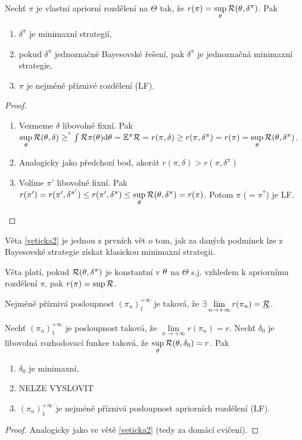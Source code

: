 \begin{theorem}\label{veticka2}
	Nechť $\pi$ je vlastní apriorní rozdělení na $\Theta$ tak, že $r(\pi)=\sup\limits_\theta\mathcal{R}(\theta,\delta^\pi)$. Pak \begin{enumerate}
		\item $\delta^\pi$ je minimaxní strategií,
		\item pokud $\delta^\pi$ jednoznačné Bayesovské řešení, pak $\delta^\pi$ je jednoznačná minimaxní strategie,
		\item $\pi$ je nejméně příznivé rozdělení (LF). 
	\end{enumerate}
\begin{proof}
	\begin{enumerate}
		\item Vezmeme $\delta$ libovolné fixní. Pak $\sup\limits_\t\RF(\t,\delta)\geq^{\text{\footnotemark}}\int\RF\pi(\t)\d\t=\E^\pi\RF=r(\pi,\delta)\geq r(\pi,\delta^\pi)=r(\pi)=\sup\limits_\t\RF(\t,\delta^\pi)$. 
		\item Analogicky jako předchozí bod, akorát $r(\pi,\delta)> r(\pi,\delta^\pi)$
		\item Volíme $\pi'$ libovolné fixní. Pak $r(\pi')=r(\pi',\delta^{\pi'})\leq r(\pi',\delta^\pi)\leq \sup\limits_\theta\mathcal{R}(\theta,\delta^\pi)=r(\pi)$. Potom $\pi$ ($=\pi^\ast$) je LF.
	\end{enumerate}
\end{proof}
\end{theorem}
\begin{remark}
Věta \ref{veticka2} je jednou z prvních vět o tom, jak za daných podmínek lze z Bayesovské strategie získat klasickou minimaxní strategii.
\end{remark}
\begin{dusl}\label{dusledek2}
	Věta platí, pokud $\mathcal{R}(\theta,\delta^\pi)$ je konstantní v $\theta$ na $\Theta$ s.j. vzhledem k apriornímu rozdělení $\pi$, pak $r(\pi)=\sup\mathcal{R}$.
\end{dusl}
\begin{theorem}
	Nejméně příznivá posloupnost $(\pi_n)_1^{+\infty}$ je taková, že $\exists\lim\limits_{n\to+\infty} r(\pi_n)=\underline{\mathcal{R}}$. 
\end{theorem}
\begin{theorem}\label{veticka3}
	Nechť $(\pi_n)_1^{+\infty}$ je posloupnost taková, že $\lim\limits_{n\to+\infty}r(\pi_n)=r$. Nechť $\delta_0$ je libovolná rozhodovací funkce taková, že $\sup\limits_\theta \mathcal{R}(\theta,\delta_0)=r$. Pak \begin{enumerate}
		\item $\delta_0$ je minimaxní,
		\item NELZE VYSLOVIT
		\item $(\pi_n)_1^{+\infty}$ je nejméně příznivá posloupnost apriorních rozdělení (LF).
	\end{enumerate}
\begin{proof}
	Analogicky jako ve větě \ref{veticka2} (tedy za domácí cvičení).
\end{proof}
\end{theorem}
